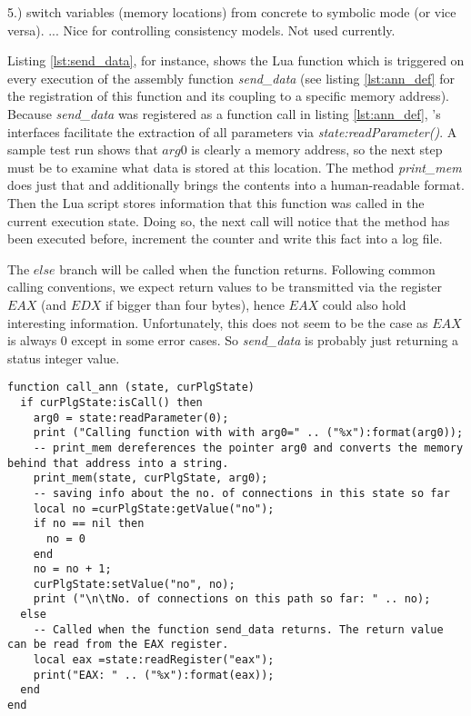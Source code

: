 5.) switch variables (memory locations) from concrete to symbolic mode (or vice versa).
... Nice for controlling consistency models. Not used currently.

\bigskip

Listing \ref{lst:send_data}, for instance, shows the Lua function which is triggered on every execution of the assembly function \textit{send\_data} (see listing \ref{lst:ann_def} for the registration of this function and its coupling to a specific memory address).
Because \textit{send\_data} was registered as a function call in listing \ref{lst:ann_def}, \sse's interfaces facilitate the extraction of all parameters via \textit{state:readParameter()}.
A sample test run shows that $arg0$ is clearly a memory address, so the next step must be to examine what data is stored at this location.
The method \textit{print\_mem} does just that and additionally brings the contents into a human-readable format.
Then the Lua script stores information that this function was called in the current execution state.
Doing so, the next call will notice that the method has been executed before, increment the counter and write this fact into a log file.

The $else$ branch will be called when the function returns.
Following common calling conventions, we expect return values to be transmitted via the register $EAX$ (and $EDX$ if bigger than four bytes), hence $EAX$ could also hold interesting information.
Unfortunately, this does not seem to be the case as $EAX$ is always $0$ except in some error cases.
So \textit{send\_data} is probably just returning a status integer value.







\bigskip
\begin{lstlisting}[language={[5.0]Lua}, basicstyle=\ttfamily\footnotesize, caption={Lua function executed upon every call of the function send\_data(). See lines 18 - 24 in listing \ref{lst:ann_def} for the registration of \textit{call\_ann}.}, label={lst:send_data}]
function call_ann (state, curPlgState)
  if curPlgState:isCall() then
    arg0 = state:readParameter(0);
    print ("Calling function with with arg0=" .. ("%x"):format(arg0));
    -- print_mem dereferences the pointer arg0 and converts the memory behind that address into a string.
    print_mem(state, curPlgState, arg0);
    -- saving info about the no. of connections in this state so far
    local no =curPlgState:getValue("no");
    if no == nil then
      no = 0
    end
    no = no + 1;
    curPlgState:setValue("no", no);
    print ("\n\tNo. of connections on this path so far: " .. no);
  else
    -- Called when the function send_data returns. The return value can be read from the EAX register.
    local eax =state:readRegister("eax");
    print("EAX: " .. ("%x"):format(eax));
  end
end
\end{lstlisting}
\bigskip

